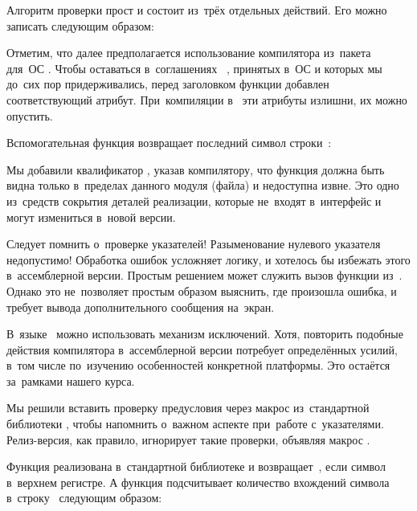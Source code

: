 
Алгоритм проверки прост и состоит из~трёх отдельных действий. Его можно записать следующим образом:


\noindent Отметим, что далее предполагается использование компилятора \GCC{} из~пакета  для~ОС . Чтобы оставаться в~соглашениях ~, принятых в~ОС  и которых мы до~сих пор придерживались, перед заголовком функции добавлен соответствующий атрибут. При~компиляции в~ эти атрибуты излишни, их можно опустить.

Вспомогательная функция  возвращает последний символ строки~:


\noindent Мы добавили квалификатор , указав компилятору, что функция должна быть видна только в~пределах данного модуля (файла) и недоступна извне. Это одно из~средств сокрытия деталей реализации, которые не~входят в~интерфейс и могут измениться в~новой версии.

Следует помнить о~проверке указателей! Разыменование нулевого указателя недопустимо! Обработка ошибок усложняет логику, и хотелось бы избежать этого в~ассемблерной версии. Простым решением может служить вызов функции  из~. Однако это не~позволяет простым образом выяснить, где произошла ошибка, и требует вывода дополнительного сообщения на~экран.

В~языке~ можно использовать механизм исключений. Хотя, повторить подобные действия компилятора в~ассемблерной версии потребует определённых усилий, в~том числе по~изучению особенностей конкретной платформы. Это остаётся за~рамками нашего курса.

Мы решили вставить проверку предусловия через макрос  из~стандартной библиотеки , чтобы напомнить о~важном аспекте при~работе с~указателями. Релиз-версия, как правило, игнорирует такие проверки, объявляя макрос .

Функция  реализована в~стандартной библиотеке  и возвращает~, если символ в~верхнем регистре. А функция  подсчитывает количество вхождений символа~ в~строку~ следующим образом:




